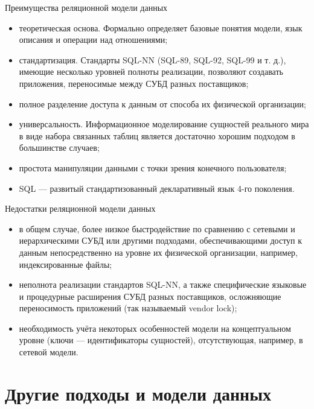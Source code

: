 \documentclass{beamer}
\begin{document}
\begin{frame}
\begin{block}{Преимущества реляционной модели данных}
\begin{itemize}
\item теоретическая основа. Формально определяет базовые понятия
модели, язык описания и операции над отношениями;
\item стандартизация. Стандарты SQL-NN (SQL-89, SQL-92, SQL-99 и
т. д.), имеющие несколько уровней полноты реализации, позволяют
создавать приложения, переносимые между СУБД разных
поставщиков;
\item полное разделение доступа к данным от способа их физической
организации;
\item универсальность. Информационное моделирование сущностей
реального мира в виде набора связанных таблиц является достаточно
хорошим подходом в большинстве случаев;
\item простота манипуляции данными с точки зрения конечного
пользователя;
\item SQL — развитый стандартизованный декларативный язык 4-го
поколения.
\end{itemize}
\end{block}
\end{frame}

\begin{frame}{}
\begin{block}{Недостатки реляционной модели данных}
\begin{itemize}
\item в общем случае, более низкое быстродействие по сравнению с
сетевыми и иерархическими СУБД или другими подходами,
обеспечивающими доступ к данным непосредственно на уровне их
физической организации, например, индексированные файлы;
\item неполнота реализации стандартов SQL-NN, а также
специфические языковые и процедурные расширения СУБД разных
поставщиков, осложняющие переносимость приложений (так
называемый vendor lock);
\item необходимость учёта некоторых особенностей модели на
концептуальном уровне (ключи — идентификаторы сущностей),
отсутствующая, например, в сетевой модели.
\end{itemize}
\end{block}
\end{frame}

\section{Другие подходы и модели данных}
\end{document}
